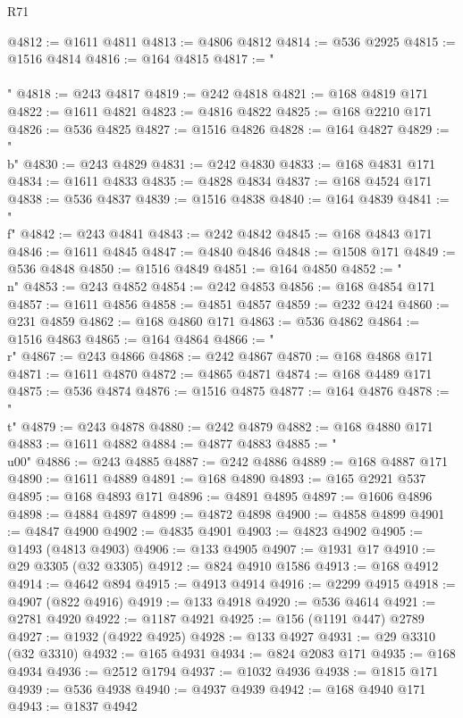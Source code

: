 \begin{lexlean}{R71}
\begin{coremodule}
@4812 := @1611 @4811
@4813 := @4806 @4812
@4814 := @536 @2925
@4815 := @1516 @4814
@4816 := @164 @4815
@4817 := "\\\\"
@4818 := @243 @4817
@4819 := @242 @4818
@4821 := @168 @4819 @171
@4822 := @1611 @4821
@4823 := @4816 @4822
@4825 := @168 @2210 @171
@4826 := @536 @4825
@4827 := @1516 @4826
@4828 := @164 @4827
@4829 := "\\b"
@4830 := @243 @4829
@4831 := @242 @4830
@4833 := @168 @4831 @171
@4834 := @1611 @4833
@4835 := @4828 @4834
@4837 := @168 @4524 @171
@4838 := @536 @4837
@4839 := @1516 @4838
@4840 := @164 @4839
@4841 := "\\f"
@4842 := @243 @4841
@4843 := @242 @4842
@4845 := @168 @4843 @171
@4846 := @1611 @4845
@4847 := @4840 @4846
@4848 := @1508 @171
@4849 := @536 @4848
@4850 := @1516 @4849
@4851 := @164 @4850
@4852 := "\\n"
@4853 := @243 @4852
@4854 := @242 @4853
@4856 := @168 @4854 @171
@4857 := @1611 @4856
@4858 := @4851 @4857
@4859 := @232 @424
@4860 := @231 @4859
@4862 := @168 @4860 @171
@4863 := @536 @4862
@4864 := @1516 @4863
@4865 := @164 @4864
@4866 := "\\r"
@4867 := @243 @4866
@4868 := @242 @4867
@4870 := @168 @4868 @171
@4871 := @1611 @4870
@4872 := @4865 @4871
@4874 := @168 @4489 @171
@4875 := @536 @4874
@4876 := @1516 @4875
@4877 := @164 @4876
@4878 := "\\t"
@4879 := @243 @4878
@4880 := @242 @4879
@4882 := @168 @4880 @171
@4883 := @1611 @4882
@4884 := @4877 @4883
@4885 := "\\u00"
@4886 := @243 @4885
@4887 := @242 @4886
@4889 := @168 @4887 @171
@4890 := @1611 @4889
@4891 := @168 @4890
@4893 := @165 @2921 @537
@4895 := @168 @4893 @171
@4896 := @4891 @4895
@4897 := @1606 @4896
@4898 := @4884 @4897
@4899 := @4872 @4898
@4900 := @4858 @4899
@4901 := @4847 @4900
@4902 := @4835 @4901
@4903 := @4823 @4902
@4905 := @1493 (@4813 @4903)
@4906 := @133 @4905
@4907 := @1931 @17
@4910 := @29 @3305 (@32 @3305)
@4912 := @824 @4910 @1586
@4913 := @168 @4912
@4914 := @4642 @894
@4915 := @4913 @4914
@4916 := @2299 @4915
@4918 := @4907 (@822 @4916)
@4919 := @133 @4918
@4920 := @536 @4614
@4921 := @2781 @4920
@4922 := @1187 @4921
@4925 := @156 (@1191 @447) @2789
@4927 := @1932 (@4922 @4925)
@4928 := @133 @4927
@4931 := @29 @3310 (@32 @3310)
@4932 := @165 @4931
@4934 := @824 @2083 @171
@4935 := @168 @4934
@4936 := @2512 @1794
@4937 := @1032 @4936
@4938 := @1815 @171
@4939 := @536 @4938
@4940 := @4937 @4939
@4942 := @168 @4940 @171
@4943 := @1837 @4942

\end{coremodule}
\end{lexlean}
